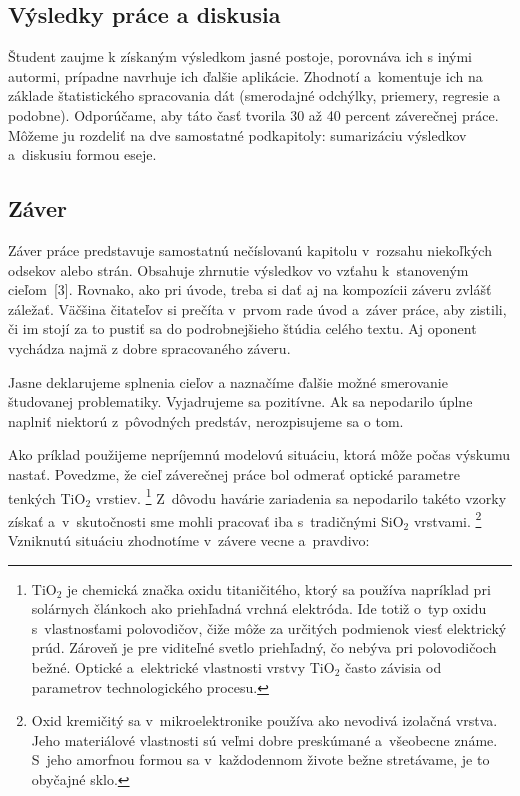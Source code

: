 \subsection*{\normalsize Výsledky práce a diskusia}
Študent zaujme k získaným výsledkom jasné postoje,
porovnáva ich s inými autormi, prípadne navrhuje ich ďalšie aplikácie.
Zhodnotí a~komentuje ich na základe štatistického spracovania dát (smerodajné odchýlky, priemery, regresie a podobne).
Odporúčame, aby táto časť tvorila 30 až 40 percent záverečnej práce.
Môžeme ju rozdeliť na dve samostatné podkapitoly: sumarizáciu výsledkov a~diskusiu formou eseje.

\subsection{Záver}
Záver práce predstavuje samostatnú nečíslovanú kapitolu
v~rozsahu niekoľkých odsekov alebo strán.
Obsahuje zhrnutie výsledkov vo vzťahu k~stanoveným cieľom~[3].
Rovnako, ako pri úvode, treba si dať
aj na kompozícii záveru zvlášť záležať.
Väčšina čitateľov si prečíta v~prvom rade úvod a~záver práce,
aby zistili, či im stojí za to pustiť sa do podrobnejšieho
štúdia celého textu.
Aj oponent vychádza najmä z dobre spracovaného záveru.

Jasne deklarujeme splnenia cieľov a naznačíme ďalšie možné smerovanie študovanej problematiky. Vyjadrujeme sa pozitívne. Ak sa nepodarilo úplne naplniť niektorú z~pôvodných predstáv, nerozpisujeme sa o tom.

Ako príklad použijeme nepríjemnú modelovú situáciu,
ktorá môže počas výskumu nastať.
Povedzme, že cieľ záverečnej práce bol odmerať
optické parametre tenkých TiO$_2$ vrstiev.%
\footnote{TiO$_2$ je chemická značka oxidu titaničitého,
ktorý sa používa napríklad pri solárnych článkoch
ako priehľadná vrchná elektróda.
Ide totiž o~typ oxidu s~vlastnosťami polovodičov,
čiže môže za určitých podmienok viesť elektrický prúd.
Zároveň je pre viditeľné svetlo priehľadný,
čo nebýva pri polovodičoch bežné.
Optické a~elektrické vlastnosti vrstvy TiO$_2$
často závisia od parametrov technologického procesu.}
Z~dôvodu havárie zariadenia sa nepodarilo takéto vzorky získať
a~v~skutočnosti sme mohli pracovať iba
s~tradičnými SiO$_2$ vrstvami.%
\footnote{Oxid kremičitý sa v~mikroelektronike používa
ako nevodivá izolačná vrstva.
Jeho materiálové vlastnosti sú veľmi dobre preskúmané
a~všeobecne známe.
S~jeho amorfnou formou sa v~každodennom živote bežne stretávame,
je to obyčajné sklo.}
Vzniknutú situáciu zhodnotíme v~závere vecne a~pravdivo:

